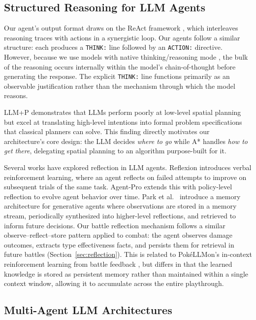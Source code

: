 \documentclass{article}
\begin{document}
\subsection{Structured Reasoning for LLM Agents}

Our agent's output format draws on the ReAct framework \citep{yao2023react}, which interleaves reasoning traces with actions in a synergistic loop. Our agents follow a similar structure: each produces a \texttt{THINK:} line followed by an \texttt{ACTION:} directive. However, because we use models with native thinking/reasoning mode \citep{wei2022chain}, the bulk of the reasoning occurs internally within the model's chain-of-thought before generating the response. The explicit \texttt{THINK:} line functions primarily as an observable justification rather than the mechanism through which the model reasons.

LLM+P \citep{liu2023llmp} demonstrates that LLMs perform poorly at low-level spatial planning but excel at translating high-level intentions into formal problem specifications that classical planners can solve. This finding directly motivates our architecture's core design: the LLM decides \emph{where to go} while A* handles \emph{how to get there}, delegating spatial planning to an algorithm purpose-built for it.

Several works have explored reflection in LLM agents. Reflexion \citep{shinn2023reflexion} introduces verbal reinforcement learning, where an agent reflects on failed attempts to improve on subsequent trials of the same task. Agent-Pro \citep{zhang2024agentpro} extends this with policy-level reflection to evolve agent behavior over time. Park et al.\ \citep{park2023generative} introduce a memory architecture for generative agents where observations are stored in a memory stream, periodically synthesized into higher-level reflections, and retrieved to inform future decisions. Our battle reflection mechanism follows a similar observe--reflect--store pattern applied to combat: the agent observes damage outcomes, extracts type effectiveness facts, and persists them for retrieval in future battles (Section~\ref{sec:reflection}). This is related to Pok\'{e}LLMon's in-context reinforcement learning from battle feedback \citep{hu2024pokellmon}, but differs in that the learned knowledge is stored as persistent memory rather than maintained within a single context window, allowing it to accumulate across the entire playthrough.

\subsection{Multi-Agent LLM Architectures}
\end{document}

